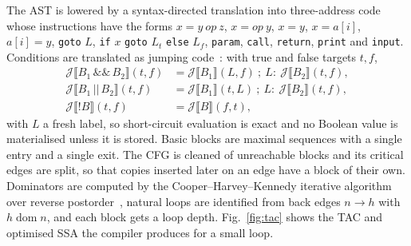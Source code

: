 \documentclass[conference]{IEEEtran}
\newcommand{\tm}[1]{\texttt{#1}}
\begin{document}
The AST is lowered by a syntax-directed translation into three-address
code whose instructions have the forms $x=y\ \mathit{op}\ z$,
$x=\mathit{op}\ y$, $x=y$, $x=a[i]$, $a[i]=y$, \tm{goto} $L$,
\tm{if} $x$ \tm{goto} $L_t$ \tm{else} $L_f$, \tm{param}, \tm{call},
\tm{return}, \tm{print} and \tm{input}. Conditions are translated as
jumping code~\cite{aho2006dragon}: with true and false targets $t,f$,
\begin{equation}
\begin{aligned}
\mathcal{J}\llbracket B_1 \,\tm{\&\&}\, B_2\rrbracket(t,f) &=
 \mathcal{J}\llbracket B_1\rrbracket(L,f)\ ;\ L{:}\ \mathcal{J}\llbracket B_2\rrbracket(t,f),\\
\mathcal{J}\llbracket B_1 \,\tm{||}\, B_2\rrbracket(t,f) &=
 \mathcal{J}\llbracket B_1\rrbracket(t,L)\ ;\ L{:}\ \mathcal{J}\llbracket B_2\rrbracket(t,f),\\
\mathcal{J}\llbracket \tm{!}B\rrbracket(t,f) &= \mathcal{J}\llbracket B\rrbracket(f,t),
\end{aligned}
\label{eq:jump}
\end{equation}
with $L$ a fresh label, so short-circuit evaluation is exact and no
Boolean value is materialised unless it is stored. Basic blocks are
maximal sequences with a single entry and a single exit. The CFG is
cleaned of unreachable blocks and its critical edges are split, so that
copies inserted later on an edge have a block of their own. Dominators
are computed by the Cooper--Harvey--Kennedy iterative algorithm over
reverse postorder~\cite{cooper2001dom}, natural loops are identified
from back edges $n\to h$ with $h \operatorname{dom} n$, and each block
gets a loop depth. Fig.~\ref{fig:tac} shows the TAC and optimised SSA
the compiler produces for a small loop.
\end{document}
